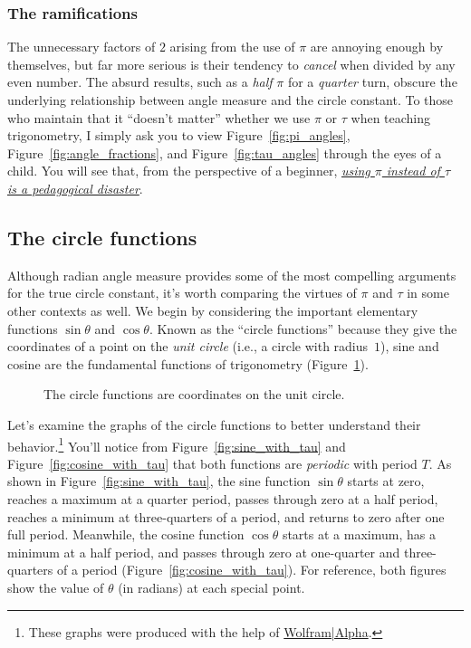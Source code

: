     \subsubsection{The ramifications} %
    \label{sec:the_ramifications}


The unnecessary factors of $2$ arising from the use of $\pi$ are annoying enough by themselves, but far more serious is their tendency to \emph{cancel} when divided by any even number. The absurd results, such as a \emph{half} $\pi$ for a \emph{quarter} turn, obscure the underlying relationship between angle measure and the circle constant. To those who maintain that it ``doesn't matter'' whether we use $\pi$ or $\tau$ when teaching trigonometry, I simply ask you to view Figure~\ref{fig:pi_angles}, Figure~\ref{fig:angle_fractions}, and Figure~\ref{fig:tau_angles} through the eyes of a child. You will see that, from the perspective of a beginner, \href{https://tauday.com/a-tau-testimonial}{\emph{using $\pi$ instead of $\tau$ is a pedagogical disaster}}.

  \subsection{The circle functions} %
  \label{sec:the_circle_functions}

Although radian angle measure provides some of the most compelling arguments for the true circle constant, it's worth comparing the virtues of $\pi$ and $\tau$ in some other contexts as well. We begin by considering the important elementary functions $\sin\theta$ and $\cos\theta$. Known as the ``circle functions''  because they give the coordinates of a point on the \emph{unit circle} (i.e., a circle with radius~$1$), sine and cosine are the fundamental functions of trigonometry (Figure~\ref{fig:circle_functions}).

\begin{figure}
\begin{center}
\end{center}
\caption{The circle functions are coordinates on the unit circle.\label{fig:circle_functions}}
\end{figure}

Let's examine the graphs of the circle functions to better understand their behavior.\footnote{These graphs were produced with the help of \href{https://www.wolframalpha.com/}{Wolfram|Alpha}.} You'll notice from Figure~\ref{fig:sine_with_tau} and Figure~\ref{fig:cosine_with_tau} that both functions are \emph{periodic} with period $T$. As shown in Figure~\ref{fig:sine_with_tau}, the sine function $\sin\theta$ starts at zero, reaches a maximum at a quarter period, passes through zero at a half period, reaches a minimum at three-quarters of a period, and returns to zero after one full period. Meanwhile, the cosine function $\cos\theta$ starts at a maximum, has a minimum at a half period, and passes through zero at one-quarter and three-quarters of a period  (Figure~\ref{fig:cosine_with_tau}). For reference, both figures show the value of $\theta$ (in radians) at each special point.

